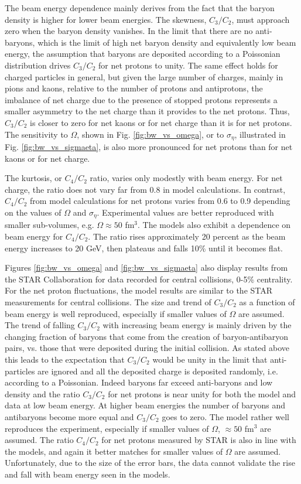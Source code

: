 The beam energy dependence mainly derives from the fact that the baryon density is higher for lower beam energies. The skewness, $C_3/C_2$, must approach zero when the baryon density vanishes. In the limit that there are no anti-baryons, which is the limit of high net baryon density and equivalently low beam energy, the assumption that baryons are deposited according to a Poissonian distribution drives $C_3/C_2$ for net protons to unity. The same effect holds for charged particles in general, but given the large number of charges, mainly in pions and kaons, relative to the number of protons and antiprotons, the imbalance of net charge due to the presence of stopped protons represents a smaller asymmetry to the net charge than it provides to the net protons. Thus, $C_3/C_2$ is closer to zero for net kaons or for net charge than it is for net protons. The sensitivity to $\Omega$, shown in Fig. \ref{fig:bw_vs_omega}, or to $\sigma_\eta$, illustrated in Fig. \ref{fig:bw_vs_sigmaeta}, is also more pronounced for net protons than for net kaons or for net charge.

The kurtosis, or $C_4/C_2$ ratio, varies only modestly with beam energy. For net charge, the ratio does not vary far from 0.8 in model calculations. In contrast, $C_4/C_2$ from model calculations for net protons varies from 0.6 to 0.9 depending on the values of $\Omega$ and $\sigma_\eta$. Experimental values are better reproduced with smaller sub-volumes, e.g. $\Omega\approx 50$ fm$^3$. The models also exhibit a dependence on beam energy for $C_4/C_2$. The ratio rises approximately 20 percent as the beam energy increases to 20 GeV, then plateaus and falls 10\% until it becomes flat.

Figures \ref{fig:bw_vs_omega} and \ref{fig:bw_vs_sigmaeta} also display results from the STAR Collaboration for data recorded for central collisions, 0-5\% centrality. For the net proton fluctuations, the model results are similar to the STAR measurements for central collisions. The size and trend of $C_3/C_2$ as a function of beam energy is well reproduced, especially if smaller values of $\Omega$ are assumed. The trend of falling $C_3/C_2$ with increasing beam energy is mainly driven by the changing fraction of baryons that come from the creation of baryon-antibaryon pairs, vs. those that were deposited during the initial collision. As stated above this leads to the expectation that $C_3/C_2$ would be unity in the limit that anti-particles are ignored and all the deposited charge is deposited randomly, i.e. according to a Poissonian. Indeed baryons far exceed anti-baryons and low density and the ratio $C_3/C_2$ for net protons is near unity for both the model and data at low beam energy. At higher beam energies the number of baryons and antibaryons become more equal and $C_3/C_2$ goes to zero. The model rather well reproduces the experiment, especially if smaller values of $\Omega$, $\approx 50$ fm$^3$ are assumed. The ratio $C_4/C_2$ for net protons measured by STAR is also in line with the models, and again it better matches for smaller values of $\Omega$ are assumed. Unfortunately, due to the size of the error bars, the data cannot validate the rise and fall with beam energy seen in the models. 

